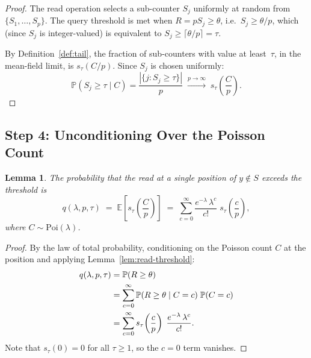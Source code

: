 \documentclass[11pt,a4paper]{article}
\newtheorem{lemma}[theorem]{Lemma}
\newcommand{\Poi}{\mathrm{Poi}}
\newcommand{\E}{\mathbb{E}}
\newcommand{\Prob}{\mathbb{P}}
\begin{document}
\begin{proof}
The read operation selects a sub-counter $S_j$ uniformly at random from
$\{S_1, \ldots, S_p\}$.  The query threshold is met when $R = p S_j \ge
\theta$, i.e.\ $S_j \ge \theta / p$, which (since $S_j$ is integer-valued)
is equivalent to $S_j \ge \lceil \theta / p \rceil = \tau$.

By Definition~\ref{def:tail}, the fraction of sub-counters with value at
least~$\tau$, in the mean-field limit, is $s_\tau(C/p)$.  Since $S_j$ is
chosen uniformly:
\begin{equation}\label{eq:uniform-choice}
  \Prob(S_j \ge \tau \mid C)
  = \frac{|\{j : S_j \ge \tau\}|}{p}
  \;\xrightarrow{p \to \infty}\; s_\tau\!\left(\frac{C}{p}\right).
\end{equation}
\end{proof}

\subsection{Step 4: Unconditioning Over the Poisson Count}
\label{ssec:fpr-step4}

\begin{lemma}\label{lem:uncondition}
The probability that the read at a single position of $y \notin S$ exceeds
the threshold is
\begin{equation}\label{eq:q-uncondition}
  q(\lambda, p, \tau)
  \;=\; \E\!\left[s_\tau\!\left(\frac{C}{p}\right)\right]
  \;=\; \sum_{c=0}^{\infty}
        \frac{e^{-\lambda}\,\lambda^c}{c!}\;
        s_\tau\!\left(\frac{c}{p}\right),
\end{equation}
where $C \sim \Poi(\lambda)$.
\end{lemma}

\begin{proof}
By the law of total probability, conditioning on the Poisson count $C$ at
the position and applying Lemma~\ref{lem:read-threshold}:
\begin{align}
  q(\lambda, p, \tau)
  &= \Prob(R \ge \theta) \notag \\
  &= \sum_{c=0}^{\infty} \Prob(R \ge \theta \mid C = c)\;\Prob(C = c)
     \notag \\
  &= \sum_{c=0}^{\infty} s_\tau\!\left(\frac{c}{p}\right)\;
     \frac{e^{-\lambda}\,\lambda^c}{c!}.
  \label{eq:q-expansion}
\end{align}
Note that $s_\tau(0) = 0$ for all $\tau \ge 1$, so the $c = 0$ term
vanishes.
\end{proof}
\end{document}
